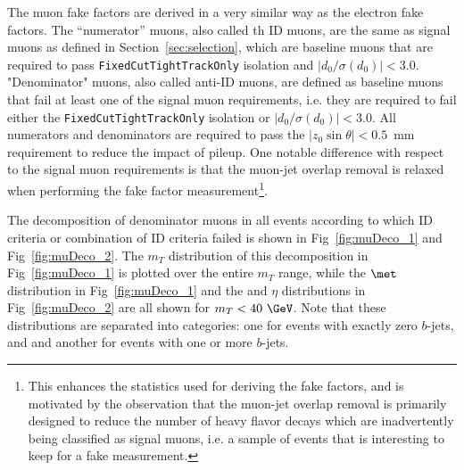 \documentclass[11pt, oneside]{article}   	%
\begin{document}
The muon fake factors are derived in a very similar way as the electron fake factors.  The ``numerator'' muons, also called th ID muons, are the same as signal muons as defined in Section~\ref{sec:selection}, which are baseline muons that are required to pass \texttt{FixedCutTightTrackOnly} isolation and $|d_0/\sigma(d_0)|<3.0$.  "Denominator" muons, also called anti-ID muons, are defined as baseline muons that fail at least one of the signal muon requirements, i.e. they are required to fail either the \texttt{FixedCutTightTrackOnly} isolation or $|d_0/\sigma(d_0)|<3.0$. All numerators and denominators are required to pass the $|z_0\sin\theta| < 0.5$~mm requirement to reduce the impact of pileup.  One notable difference with respect to the signal muon requirements is that the muon-jet overlap removal is relaxed when performing the fake factor measurement\footnote{This enhances the statistics used for deriving the fake factors, and is motivated by the observation that the muon-jet overlap removal is primarily designed to reduce the number of heavy flavor decays which are inadvertently being classified as signal muons, i.e. a sample of events that is interesting to keep for a fake measurement.}.

The decomposition of denominator muons in all events according to which ID criteria or combination of ID criteria failed is shown in Fig~\ref{fig:muDeco_1} and Fig~\ref{fig:muDeco_2}. The  $m_{T}$ distribution of this decomposition in Fig~\ref{fig:muDeco_1} is plotted over the entire $m_{T}$ range, while the $\met$ distribution in Fig~\ref{fig:muDeco_1} and the \pt{} and $\eta$ distributions in Fig~\ref{fig:muDeco_2} are all shown for $m_{T} <40~\GeV$.  Note that these distributions are separated into categories: one for events with exactly zero $b$-jets, and and another for events with one or more $b$-jets.
\end{document}

